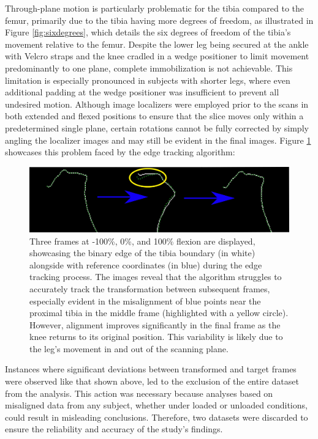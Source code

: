\documentclass{micro-econ-thesis}
\begin{document}
Through-plane motion is particularly problematic for the tibia compared to the femur, primarily due to the tibia having more degrees of freedom, as illustrated in Figure \ref{fig:sixdegrees}, which details the six degrees of freedom of the tibia's movement relative to the femur. Despite the lower leg being secured at the ankle with Velcro straps and the knee cradled in a wedge positioner to limit movement predominantly to one plane, complete immobilization is not achievable. This limitation is especially pronounced in subjects with shorter legs, where even additional padding at the wedge positioner was insufficient to prevent all undesired motion. Although image localizers were employed prior to the scans in both extended and flexed positions to ensure that the slice moves only within a predetermined single plane, certain rotations cannot be fully corrected by simply angling the localizer images and may still be evident in the final images. 
Figure \ref{fig:edgebad} showcases this problem faced by the edge tracking algorithm: 

\begin{figure}[H]
	\centering
	\includegraphics[width=0.9\linewidth]{three_try2}
	\caption{Three frames at -100\%, 0\%, and 100\% flexion are displayed, showcasing the binary edge of the tibia boundary (in white) alongside with reference coordinates (in blue) during the edge tracking process. The images reveal that the algorithm struggles to accurately track the transformation between subsequent frames, especially evident in the misalignment of blue points near the proximal tibia in the middle frame (highlighted with a yellow circle). However, alignment improves significantly in the final frame as the knee returns to its original position. This variability is likely due to the leg's movement in and out of the scanning plane.}
	\label{fig:edgebad}
\end{figure}


Instances where significant deviations between transformed and target frames were observed like that shown above, led to the exclusion of the entire dataset from the analysis. This action was necessary because analyses based on misaligned data from any subject, whether under loaded or unloaded conditions, could result in misleading conclusions. Therefore, two datasets were discarded to ensure the reliability and accuracy of the study's findings.
\end{document}
